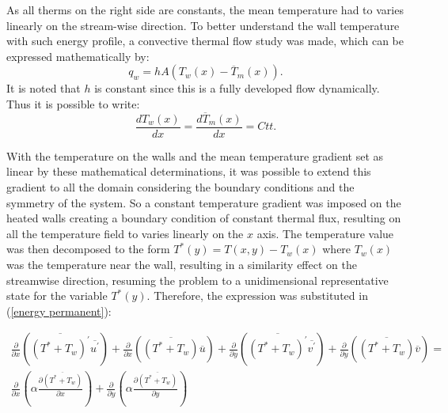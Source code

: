\documentclass[10pt]{article} %
\begin{document}
As all therms on the right side are constants, the mean temperature had to varies linearly on the stream-wise direction.  
To better understand the wall temperature with such energy profile, a convective thermal flow study was made, which can be expressed mathematically by:
\begin{equation}
q_w = h A \left( T_w(x) - \overline{T}_m(x)\right).
\end{equation}
It is noted that $h$ is constant since this is a fully developed flow dynamically. Thus it is possible to write:
\begin{equation}
\frac{d T_w(x)}{d x} = \frac{d \overline{T}_m(x)}{d x} = Ctt.
\end{equation}	

With the temperature on the walls and the mean temperature gradient set as linear by these mathematical determinations, it was possible to extend this gradient to all the domain considering the boundary conditions and the symmetry of the system. So a constant temperature gradient was imposed on the heated walls creating a boundary condition of constant thermal flux, resulting on all the temperature field to varies linearly on the $x$ axis. The temperature value was then decomposed to the form $ T^\ast(y) = T(x,y) - T_w(x) $ where $T_w(x)$ was the temperature near the wall, resulting in a similarity effect on the streamwise direction, resuming the problem to a unidimensional representative state for the variable $T^\ast(y)$. Therefore, the expression was substituted in (\ref{energy permanent}):



\begin{equation}
\begin{split}
\frac{\partial{}}{\partial{x}} \left(\overline{(T^\ast + T_w)^\prime} \overline{ u^\prime}\right) + \frac{\partial{}}{\partial{x}}\left(\overline{(T^\ast + T_w)} \overline{u}\right)+ 
\frac{\partial{}}{\partial{y}} \left(\overline{(T^\ast + T_w)^\prime} \overline{ v^\prime}\right) + \frac{\partial{}}{\partial{y}}\left(\overline{(T^\ast + T_w)} \overline{v}\right) = \\
{\frac{\partial{}}{\partial{x}}} \left(\alpha {\frac{\partial{\overline{(T^\ast + T_w)}}}{\partial{x}}} \right) +
{\frac{\partial{}}{\partial{y}}} \left(\alpha {\frac{\partial{\overline{(T^\ast + T_w)}}}{\partial{y}}} \right) 
\end{split}
\end{equation}
\end{document}
